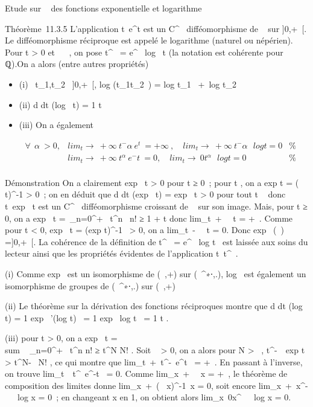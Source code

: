 \documentclass[]{article}
\begin{document}
Etude sur ~ des fonctions exponentielle et logarithme

Théorème~11.3.5 L'application
t\mapsto~e^t est un C^\infty~
difféomorphisme de ~ sur ]0,+\infty~[. Le difféomorphisme réciproque est
appelé le logarithme (naturel ou népérien). Pour t > 0 et \alpha~
\in {}~, on pose t^\alpha~ = e^\alpha~ log~
t (la notation est cohérente pour \alpha~ \in ℚ).On a alors (entre autres
propriétés)

\begin{itemize}
\item
  (i) \forall~t_1,t_2~ \in]0,+\infty~[,
  log (t_1t_2~)
  = log t_1~ +\
  log t_2
\item
  (ii)  d \over dt (log~ t)
  = 1 \over t
\item
  (iii) On a également

  \begin{align*} \forall~~\alpha~
  > 0, &
  lim_t\rightarrow~+\infty~t^-\alpha~e^t~
  = +\infty~,\quad
  lim_t\rightarrow~+\infty~t^-\alpha~~\
  log t = 0& \%& \\ &
  lim_t\rightarrow~+\infty~t^\alpha~e^-t~
  = 0,\quad
  lim_t\rightarrow~0t^\alpha~~\
  log t = 0 & \%& \\
  \end{align*}
\end{itemize}

Démonstration On a clairement exp~ t
> 0 pour t ≥ 0~; pour t , on a
exp t = (\exp~
t)^-1 > 0~; on en déduit que
 d \over dt (exp~ t)
= exp~ t > 0 pour tout t \in {}~ donc
t\mapsto~exp~ t est un
C^\infty~ difféomorphisme croissant de ~ sur son image. Mais, pour
t ≥ 0, on a exp~ t =\
\sum  _n=0^+\infty~ t^n~
\over n! ≥ 1 + t donc
lim_t\rightarrow~+\infty~\exp~
t = +\infty~. Comme pour t < 0, exp~ t =
(exp t)^-1~
> 0, on a
lim_t\rightarrow~-\infty~\exp~
t = 0. Donc exp~ (\mathbb{R}~) =]0,+\infty~[. La cohérence
de la définition de t^\alpha~ =
e^\alpha~ log t~ est laissée aux soins du
lecteur ainsi que les propriétés évidentes de l'application
t\mapsto~t^\alpha~.

(i) Comme exp~ est un isomorphisme de (~,+) sur
(~^∗⋅,.), log~ est également un
isomorphisme de groupes de (~^∗⋅,.) sur (\mathbb{R}~,+)

(ii) Le théorème sur la dérivation des fonctions réciproques montre que
 d \over dt (log~ t) = 1
\over exp~
'(log t)~ = 1 \over
exp \ log t~ = 1
\over t .

(iii) pour t > 0, on a exp~ t
= \\sum ~
_n=0^+\infty~ t^n \over n! ≥
t^N \over N! . Soit \alpha~ > 0, on a
alors pour N > \alpha~, t^-\alpha~\
exp t > t^N-\alpha~ \over N! , ce
qui montre que
lim_t\rightarrow~+\infty~t^-\alpha~e^t~
= +\infty~. En passant à l'inverse, on trouve
lim_t\rightarrow~\infty~t^\alpha~e^-t~
= 0. Comme
lim_x\rightarrow~+\infty~\log~
x = +\infty~, le théorème de composition des limites donne
lim_x\rightarrow~+\infty~(\log~
x)^-1\diagup\alpha~x = 0, soit encore
lim_x\rightarrow~+\infty~x^-\alpha~~\
log x = 0~; en changeant x en 1\diagupx, on obtient alors
lim_x\rightarrow~0x^\alpha~~\
log x = 0.
\end{document}
